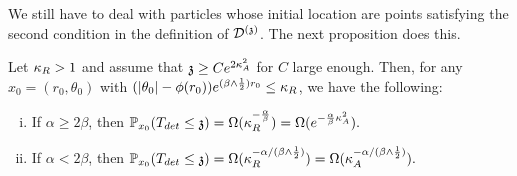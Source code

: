We still have to deal with particles whose initial location are points satisfying the second condition in the definition of $\mathcal{D}^{(\mathfrak{z})}$. The next proposition does this.
\begin{proposition}\label{prop:uniformlowerboundN2}
Let $\kappa_R >1$ and assume that $\mathfrak{z}\ge Ce^{2\kappa_A^2}$ for $C$ large enough.
Then, for any $x_0=(r_0,\theta_0)$ with 
$(|\theta_0|-\phi(r_0))e^{(\beta\wedge\frac12)r_0} \le \kappa_R$, we have the following: 
\begin{enumerate}[(i)]

\item\label{prop:uniformLowerboundN2:itm1} If $\alpha \ge 2\beta$, then 
$\displaystyle 
\mathbb{P}_{x_0}(T_{det} \leq \mathfrak{z})=\Omega(\kappa_R^{-\frac{\alpha}{\beta}})
=\Omega(e^{-{\frac{\alpha}{\beta}\kappa_A^2}}).
$
\item\label{prop:uniformLowerboundN2:itm2} If $\alpha < 2\beta$, %
then  
$\displaystyle
\mathbb{P}_{x_0}(T_{det} \leq \mathfrak{z}) = \Omega(\kappa_R^{-\alpha/(\beta\wedge\frac12)})=\Omega(\kappa_A^{-\alpha/(\beta\wedge\frac12)}).
$
\end{enumerate}
\end{proposition}
